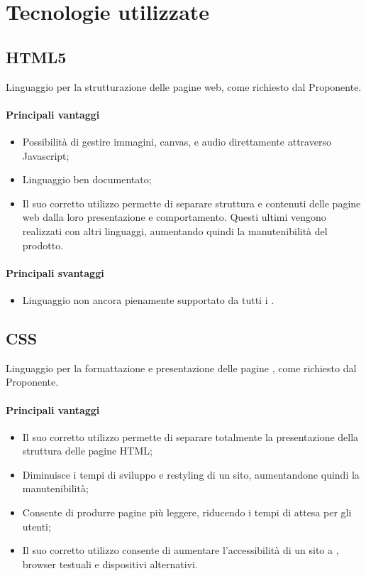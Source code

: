 \documentclass[../PianoDiQualifica.tex]{subfiles}
\begin{document}
	\section{Tecnologie utilizzate}
		\subsection{HTML5}
			Linguaggio per la strutturazione delle pagine web, come richiesto dal Proponente.
			\paragraph{Principali vantaggi}
				\begin{itemize}
					\item Possibilità di gestire immagini, canvas, e audio direttamente
					attraverso Javascript;
					\item Linguaggio ben documentato;
					\item Il suo corretto utilizzo permette di separare struttura e contenuti delle
					pagine web	dalla loro presentazione e comportamento. Questi ultimi vengono realizzati con
					altri linguaggi, aumentando quindi la manutenibilità del prodotto.
				\end{itemize}
			\paragraph{Principali svantaggi}
				\begin{itemize}
					\item Linguaggio non ancora	pienamente supportato da tutti i .
				\end{itemize}
		\subsection{CSS}
			Linguaggio per la formattazione e presentazione delle pagine , come richiesto dal
			Proponente.
			\paragraph{Principali vantaggi}
			\begin{itemize}
					\item Il suo corretto utilizzo permette di separare totalmente la presentazione
					della struttura delle pagine HTML;
					\item Diminuisce i tempi di sviluppo e restyling di un sito, aumentandone quindi
					la manutenibilità;
					\item Consente di produrre pagine più leggere, riducendo i tempi di attesa per
					gli utenti;
					\item Il suo corretto utilizzo consente di aumentare l'accessibilità di un sito
					a , browser testuali e dispositivi alternativi.
				\end{itemize}
\end{document}
